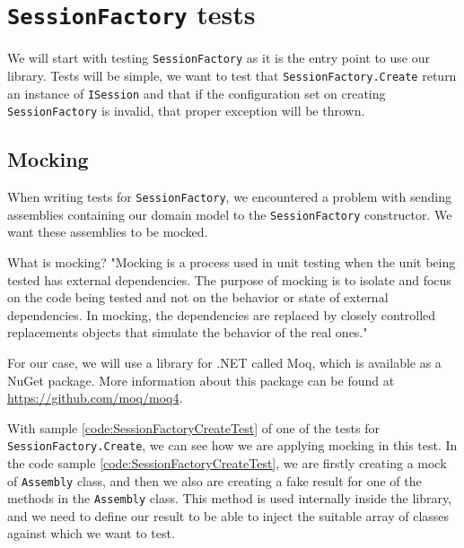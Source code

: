 \section{\texttt{SessionFactory} tests}

We will start with testing \texttt{SessionFactory} as it is the entry point to use our library. Tests will be simple,
we want to test that \texttt{SessionFactory.Create} return an instance of \texttt{ISession} and that if the configuration
set on creating \texttt{SessionFactory} is invalid, that proper exception will be thrown.

\subsection{Mocking}

When writing tests for \texttt{SessionFactory}, we encountered a problem with sending assemblies containing our domain model to the \texttt{SessionFactory}
constructor. We want these assemblies to be mocked.

What is mocking? "Mocking is a process used in unit testing when the unit being tested has external dependencies.
The purpose of mocking is to isolate and focus on the code being tested and not on the behavior or state of external dependencies.
In mocking, the dependencies are replaced by closely controlled replacements
objects that simulate the behavior of the real ones." \cite{noauthor_mocking_nodate}

For our case, we will use a library for .NET called Moq, which is available as a NuGet package. More information about this package can
be found at \url{https://github.com/moq/moq4}.

With sample \ref{code:SessionFactoryCreateTest} of one of the tests for \texttt{SessionFactory.Create}, we can see how we are applying mocking in this test.
In the code sample \ref{code:SessionFactoryCreateTest}, we are firstly creating a mock of \texttt{Assembly} class, and then we also are creating a fake result for
one of the methods in the \texttt{Assembly} class. This method is used internally inside the library, and we need to define our result to be able to inject the suitable
array of classes against which we want to test.


